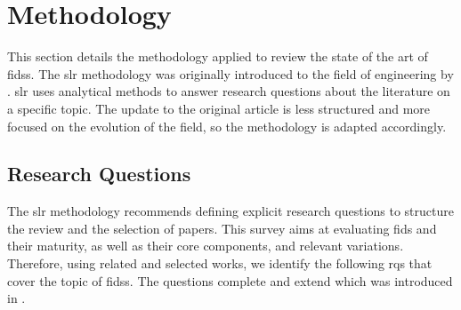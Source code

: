 \section{Methodology\label{sec:sota.methodo}}

This section details the methodology applied to review the state of the art of \glspl{fids}.
The \gls{slr} methodology was originally introduced to the field of engineering by \textcite{kitchenham_Guidelinesperformingsystematic_2007}.
\Gls{slr} uses analytical methods to answer research questions about the literature on a specific topic.
The update to the original article is less structured and more focused on the evolution of the field, so the methodology is adapted accordingly.


\subsection{Research Questions\label{sec:sota.methodo.questions}}

The \gls{slr} methodology recommends defining explicit research questions to structure the review
and the selection of papers.
This survey aims at evaluating \gls{fids} and their maturity, as well
as their core components, and relevant variations.
Therefore, using related and selected works, we identify the following \glspl{rq} that cover the topic of \glspl{fids}.
The questions complete and extend  which was introduced in .

